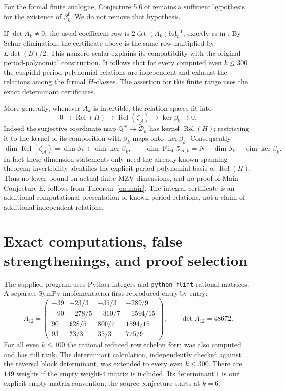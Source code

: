 \documentclass[12pt]{amsart}
\theoremstyle{definition}
\theoremstyle{remark}
\numberwithin{equation}{section}
\newcommand{\Q}{\mathbb{Q}}
\newcommand{\Fil}{\operatorname{Fil}}
\newcommand{\za}{\zeta_{\mathcal A}}
\newcommand{\Dtilde}{\widetilde{\mathcal D}_k}
\newcommand{\Relf}{\operatorname{Rel}}
\theoremstyle{definition}
\theoremstyle{remark}
\begin{document}
For the formal finite analogue, Conjecture 5.6 of \cite{BR} remains a
sufficient hypothesis for the existence of $\beta_k^{\mathrm f}$.
We do not remove that hypothesis.

If $\det A_k\ne0$, the usual coefficient row is
$2\det(A_k)bA_k^{-1}$, exactly as in \cite[Theorem 5.17]{BR}.
By Schur elimination, the certificate above is the same row multiplied
by $L\det(B)/2$. This nonzero scalar explains its compatibility with
the original period-polynomial construction. It follows that for every
computed even $k\leq300$ the cuspidal period-polynomial relations are
independent and exhaust the relations among the formal $H$-classes.
The assertion for this finite range uses the exact determinant certificates.

More generally, whenever $A_k$ is invertible, the relation spaces fit into
\begin{equation}\label{en:exactseq}
 0\longrightarrow\Relf(H)\longrightarrow\Relf(\za)
 \longrightarrow\ker\beta_k\longrightarrow0.
\end{equation}
Indeed the surjective coordinate map $\Q^N\to\Dtilde$ has kernel
$\Relf(H)$; restricting it to the kernel of its composition with $\beta_k$
maps onto $\ker\beta_k$. Consequently
\[
 \dim\Relf(\za)=\dim\mathcal S_k+\dim\ker\beta_k,
 \qquad \dim\Fil_4\mathcal Z_{\mathcal A,k}
 =N-\dim\mathcal S_k-\dim\ker\beta_k.
\]
In fact these dimension statements only need the already known spanning
theorem; invertibility identifies the explicit period-polynomial basis
of $\Relf(H)$. Thus no lower bound on actual finite-MZV dimensions, and
no proof of Main Conjecture E, follows from Theorem~\ref{en:main}.
The integral certificate is an additional computational presentation of
known period relations, not a claim of additional independent relations.

\section{Exact computations, false strengthenings, and proof selection}
The supplied program uses Python integers and \texttt{python-flint}
rational matrices. A separate SymPy implementation first reproduced
\cite[Example 5.18]{BR} entry by entry:
\[
 A_{12}=\begin{pmatrix}
 -39&-23/3&-35/3&-289/9\\
 -90&-278/5&-310/7&-1594/15\\
 90&628/5&800/7&1594/15\\
 93&23/3&35/3&775/9
 \end{pmatrix},\qquad\det A_{12}=48672.
\]
For all even $k\leq100$ the rational reduced row echelon form was also
computed and has full rank. The determinant calculation, independently
checked against the reversal block determinant, was extended to every
even $k\leq300$. There are $149$ weights if the empty weight-$4$ matrix
is included. Its determinant $1$ is our explicit empty-matrix convention;
the source conjecture starts at $k=6$.
\end{document}
